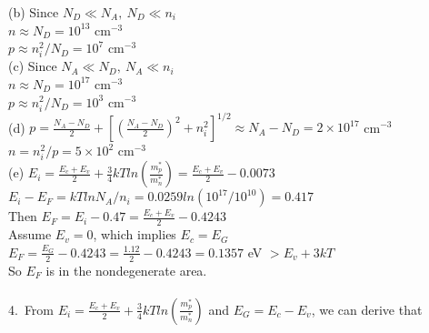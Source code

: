 \documentclass[11pt,oneside,a4paper]{article}
\begin{document}
\quad (b) Since \(N_D\ll N_A,\ N_D\ll n_i\) \\

\hspace{8.5mm} \(n\approx N_D=10^{13}\) cm\(^{-3}\) \\

\hspace{8.5mm} \(p\approx n_i^2/N_D=10^7\) cm\(^{-3}\) \\

\quad (c) Since \(N_A\ll N_D,\ N_A\ll n_i\) \\

\hspace{8.5mm} \(n\approx N_D=10^{17}\) cm\(^{-3}\) \\

\hspace{8.5mm} \(p\approx n_i^2/N_D=10^3\) cm\(^{-3}\) \\

\quad (d) \(p=\frac{N_A-N_D}{2}+\left[\left(\frac{N_A-N_D}{2}\right)^2+n_i^2\right]^{1/2}\approx N_A-N_D=2\times10^{17}\) cm\(^{-3}\) \\

\hspace{8.5mm} \(n=n_i^2/p=5\times10^2\) cm\(^{-3}\) \\

\quad (e) \(E_i=\frac{E_c+E_v}{2}+\frac{3}{4}kTln\left(\frac{m_p^*}{m_n^*}\right)=\frac{E_c+E_v}{2}-0.0073\) \\

\hspace{8.5mm} \(E_i-E_F=kTlnN_A/n_i=0.0259ln(10^{17}/10^{10})=0.417\) \\

\hspace{8.5mm} Then \(E_F=E_i-0.47=\frac{E_c+E_v}{2}-0.4243\) \\

\hspace{8.5mm} Assume \(E_v=0\), which implies \(E_c=E_G\) \\

\hspace{8.5mm} \(E_F=\frac{E_G}{2}-0.4243=\frac{1.12}{2}-0.4243=0.1357\) eV \(>E_v+3kT\) \\

\hspace{8.5mm} So \(E_F\) is in the nondegenerate area. \\
\\

4.\ From \(E_i=\frac{E_c+E_v}{2}+\frac{3}{4}kTln\left(\frac{m_p^*}{m_n^*}\right)\) and \(E_G=E_c-E_v\), we can derive that \\
\end{document}
